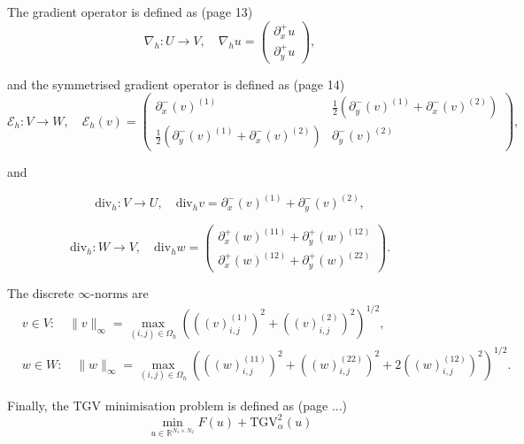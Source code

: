 \documentclass{article}
\begin{document}
The gradient operator is defined as (page 13)
\begin{equation}
    \nabla_h : U \rightarrow V, \quad \nabla_h u = 
    \begin{pmatrix}
    \partial_x^+ u \\
    \partial_y^+ u
    \end{pmatrix},
\end{equation}

and the symmetrised gradient operator is defined as (page 14)
\begin{equation}
    \mathcal{E}_h : V \rightarrow W, \quad \mathcal{E}_h (v) = 
    \begin{pmatrix}
    \partial_x^- (v)^{(1)} &
    \frac{1}{2} \left( \partial_y^- (v)^{(1)} + \partial_x^- (v)^{(2)} \right) \\
    \frac{1}{2} \left( \partial_y^- (v)^{(1)} + \partial_x^- (v)^{(2)} \right) &
    \partial_y^- (v)^{(2)}
    \end{pmatrix},
\end{equation}

and


\begin{equation}
\mathrm{div}_h : V \rightarrow U, \quad \mathrm{div}_h v = \partial_x^- (v)^{(1)} + \partial_y^- (v)^{(2)},
\end{equation}

\begin{equation}
\mathrm{div}_h : W \rightarrow V, \quad \mathrm{div}_h w = 
\begin{pmatrix}
\partial_x^+ (w)^{(11)} + \partial_y^+ (w)^{(12)} \\
\partial_x^+ (w)^{(12)} + \partial_y^+ (w)^{(22)}
\end{pmatrix}.
\end{equation}

The discrete $\infty\text{-norms}$ are
\begin{equation}
    \begin{aligned}
    & v \in V : \quad \|v\|_\infty = \max_{(i,j) \in \Omega_h} \left( \left( (v)_{i,j}^{(1)} \right)^{2} + \left( (v)_{i,j}^{(2)} \right)^{2} \right)^{1/2}, \\
    & w \in W : \quad \|w\|_\infty = \max_{(i,j) \in \Omega_h} \left( \left( (w)_{i,j}^{(11)} \right)^{2} + \left( (w)_{i,j}^{(22)} \right)^{2} + 2 \left( (w)_{i,j}^{(12)} \right)^{2} \right)^{1/2}.
\end{aligned}
\end{equation}


Finally, the TGV minimisation problem
is defined as (page ...)
\begin{equation}
    \min_{u \in \mathbb{R}^{N_1 \times N_2}} F(u) + \mathrm{TGV}^2_\alpha(u)
    \label{eq:tgv_minimisation_problem}
\end{equation}
\end{document}
